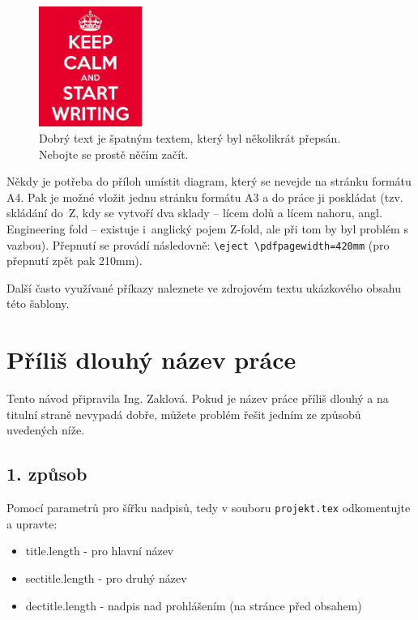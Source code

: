 \begin{figure}[hbt]
	\centering
	\includegraphics[width=0.3\textwidth]{obrazky-figures/keep-calm.png}
	\caption{Dobrý text je špatným textem, který byl několikrát přepsán. Nebojte se prostě něčím začít.}
	\label{keepCalm}
\end{figure}

Někdy je potřeba do příloh umístit diagram, který se nevejde na stránku formátu A4. Pak je možné vložit jednu stránku formátu A3 a do práce ji poskládat (tzv. skládání do~Z, kdy se vytvoří dva sklady -- lícem dolů a lícem nahoru, angl. Engineering fold -- existuje i~anglický pojem Z-fold, ale při tom by byl problém s vazbou). Přepnutí se provádí následovně: \texttt{\textbackslash{}eject \textbackslash{}pdfpagewidth=420mm} (pro přepnutí zpět pak 210mm).

Další často využívané příkazy naleznete ve zdrojovém textu ukázkového obsahu této šablony.



\newcommand{\odradkovani}{\\[0.3em]}

\chapter{Příliš dlouhý název práce}
Tento návod připravila Ing. Zaklová. Pokud je název práce příliš dlouhý a na titulní straně nevypadá dobře, můžete problém řešit jedním ze způsobů uvedených níže.

\section{1. způsob}
Pomocí parametrů pro šířku nadpisů, tedy v souboru \texttt{projekt.tex} odkomentujte a upravte:
\begin{itemize}
	\item title.length - pro hlavní název
 	\item sectitle.length - pro druhý název
 	\item dectitle.length - nadpis nad prohlášením (na stránce před obsahem)  
\end{itemize}

